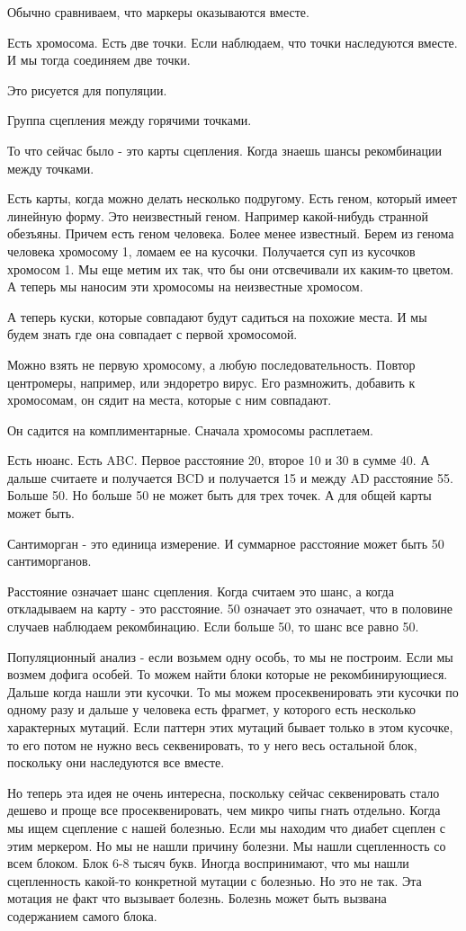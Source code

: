 Обычно сравниваем, что маркеры оказываются вместе. 

Есть хромосома. Есть две точки. Если наблюдаем, что 
точки наследуются вместе. И мы тогда соединяем две точки. 

Это рисуется для популяции. 

Группа сцепления между горячими точками. 


То что сейчас было - это 
карты сцепления. Когда знаешь шансы рекомбинации между точками. 

Есть карты, когда можно делать несколько подругому. Есть геном, 
который имеет линейную форму. Это неизвестный геном. Например 
какой-нибудь странной обезъяны. Причем есть 
геном человека. Более менее известный. Берем из 
генома человека хромосому 1, ломаем ее на кусочки. 
Получается суп из кусочков хромосом 1. Мы еще метим их так, 
что бы они отсвечивали их каким-то цветом. А теперь 
мы наносим эти хромосомы на неизвестные хромосом. 

А теперь куски, которые совпадают будут садиться на 
похожие места. И мы будем знать где она совпадает 
с первой хромосомой. 

Можно взять не первую хромосому, а любую последовательность. 
Повтор центромеры, например, или эндоретро вирус. Его размножить, 
добавить к хромосомам, он сядит на места, которые с ним совпадают. 

Он садится на комплиментарные. Сначала хромосомы расплетаем. 

Есть нюанс. Есть ABC. Первое расстояние 20, второе 10 и 30 в сумме 40. А дальше считаете и 
получается BCD и получается 15 и между AD расстояние 55. Больше 50. Но больше 50 не может 
быть для трех точек. А для общей карты может быть. 

Сантиморган - это единица измерение. И суммарное расстояние может быть 50 сантиморганов. 

Расстояние означает шанс сцепления. Когда считаем это шанс, а когда откладываем на карту - это 
расстояние. 50 означает это означает, что в половине случаев наблюдаем рекомбинацию. Если больше 50, то 
шанс все равно 50. 

Популяционный анализ - если возьмем одну особь, то мы не построим. Если мы возмем дофига особей. 
То можем найти блоки которые не рекомбинирующиеся. Дальше когда нашли эти кусочки. То 
мы можем просеквенировать эти кусочки по одному разу и дальше у человека есть 
фрагмет, у которого есть несколько характерных мутаций. Если паттерн этих 
мутаций бывает только в этом кусочке, то его потом не нужно весь секвенировать, 
то у него весь остальной блок, поскольку они наследуются все вместе. 

Но теперь эта идея не очень интересна, поскольку сейчас секвенировать стало дешево и 
проще все просеквенировать, чем микро чипы гнать отдельно. Когда мы ищем сцепление с нашей болезнью. 
Если мы находим что диабет сцеплен с этим меркером. Но мы  не нашли причину болезни. 
Мы нашли сцепленность со всем блоком. Блок 6-8 тысяч букв. Иногда воспринимают, что 
мы нашли сцепленность какой-то конкретной мутации с болезнью. Но это не так. 
Эта мотация не факт что вызывает болезнь. Болезнь может быть вызвана содержанием самого блока. 



